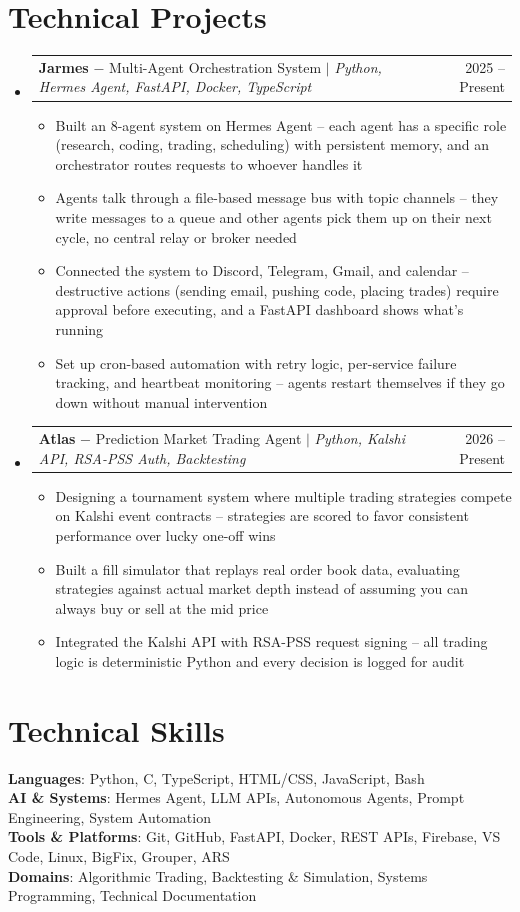 \documentclass[letterpaper,10pt]{article}
\makeatletter
\newcommand{\resumeItem}[1]{
  \item\small{{#1 \vspace{-2pt}}}
}
\newcommand{\resumeProjectHeading}[2]{
    \item
    \begin{tabular*}{0.97\textwidth}{l@{\extracolsep{\fill}}r}
      \small#1 & #2 \\
    \end{tabular*}\vspace{-5pt}
}
\newcommand{\resumeSubHeadingListStart}{\begin{itemize}[leftmargin=0.15in, label={}]}
\newcommand{\resumeSubHeadingListEnd}{\end{itemize}}
\newcommand{\resumeItemListStart}{\begin{itemize}[leftmargin=0.25in, itemsep=1pt, parsep=0pt, topsep=0pt]}
\newcommand{\resumeItemListEnd}{\end{itemize}\vspace{-3pt}}
\makeatother
\begin{document}
\section{Technical Projects}
    \resumeSubHeadingListStart
      \resumeProjectHeading
          {\textbf{Jarmes} $-$ Multi-Agent Orchestration System $|$ \emph{Python, Hermes Agent, FastAPI, Docker, TypeScript}}{2025 -- Present}
          \resumeItemListStart
            \resumeItem{Built an 8-agent system on Hermes Agent -- each agent has a specific role (research, coding, trading, scheduling) with persistent memory, and an orchestrator routes requests to whoever handles it}
            \resumeItem{Agents talk through a file-based message bus with topic channels -- they write messages to a queue and other agents pick them up on their next cycle, no central relay or broker needed}
            \resumeItem{Connected the system to Discord, Telegram, Gmail, and calendar -- destructive actions (sending email, pushing code, placing trades) require approval before executing, and a FastAPI dashboard shows what's running}
            \resumeItem{Set up cron-based automation with retry logic, per-service failure tracking, and heartbeat monitoring -- agents restart themselves if they go down without manual intervention}
          \resumeItemListEnd
      \resumeProjectHeading
          {\textbf{Atlas} $-$ Prediction Market Trading Agent $|$ \emph{Python, Kalshi API, RSA-PSS Auth, Backtesting}}{2026 -- Present}
          \resumeItemListStart
            \resumeItem{Designing a tournament system where multiple trading strategies compete on Kalshi event contracts -- strategies are scored to favor consistent performance over lucky one-off wins}
            \resumeItem{Built a fill simulator that replays real order book data, evaluating strategies against actual market depth instead of assuming you can always buy or sell at the mid price}
            \resumeItem{Integrated the Kalshi API with RSA-PSS request signing -- all trading logic is deterministic Python and every decision is logged for audit}
          \resumeItemListEnd
    \resumeSubHeadingListEnd

\section{Technical Skills}
 \begin{itemize}[leftmargin=0.15in, label={}]
    \small{\item{
     \textbf{Languages}{: Python, C, TypeScript, HTML/CSS, JavaScript, Bash} \\
     \textbf{AI \& Systems}{: Hermes Agent, LLM APIs, Autonomous Agents, Prompt Engineering, System Automation} \\
     \textbf{Tools \& Platforms}{: Git, GitHub, FastAPI, Docker, REST APIs, Firebase, VS Code, Linux, BigFix, Grouper, ARS} \\
     \textbf{Domains}{: Algorithmic Trading, Backtesting \& Simulation, Systems Programming, Technical Documentation}
    }}
 \end{itemize}
\end{document}
